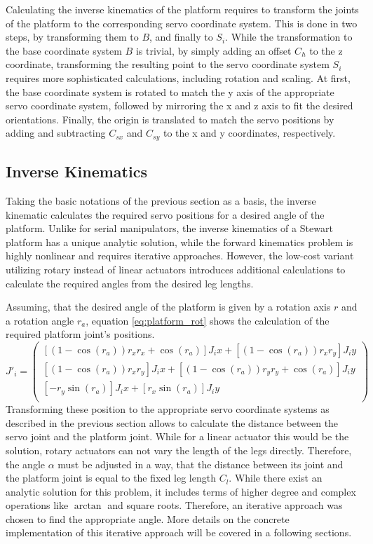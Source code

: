 Calculating the inverse kinematics of the platform requires to transform the
joints of the platform to the corresponding servo coordinate system. This is
done in two steps, by transforming them to $B$, and finally to $S_i$. While
the transformation to the base coordinate system $B$ is trivial, by simply
adding an offset $C_h$ to the z coordinate, transforming the resulting point
to the servo coordinate system $S_i$ requires more sophisticated calculations,
including rotation and scaling. At first, the base coordinate system is
rotated to match the y axis of the appropriate servo coordinate system,
followed by mirroring the x and z axis to fit the desired orientations.
Finally, the origin is translated to match the servo positions by adding and
subtracting $C_{sx}$ and $C_{sy}$ to the x and y coordinates, respectively.

\subsection{Inverse Kinematics}
Taking the basic notations of the previous section as a basis, the inverse
kinematic calculates the required servo positions for a desired angle of the
platform. Unlike for serial manipulators, the inverse kinematics of a Stewart
platform has a unique analytic solution, while the forward kinematics problem
is highly nonlinear and requires iterative approaches. However, the low-cost
variant utilizing rotary instead of linear actuators introduces additional
calculations to calculate the required angles from the desired leg lengths.

Assuming, that the desired angle of the platform is given by a rotation axis
$r$ and a rotation angle $r_a$, equation \ref{eq:platform_rot} shows the
calculation of the required platform joint's positions.
\begin{equation}
J'_i = 
\begin{pmatrix}
\left[\left(1 - \cos(r_a)\right) r_x r_x + \cos(r_a)\right] J_ix + \left[\left(1 - \cos(r_a)\right) r_x r_y\right] J_iy\\
\left[\left(1 - \cos(r_a)\right) r_x r_y\right] J_ix + \left[\left(1 - \cos(r_a)\right) r_y r_y + \cos(r_a)\right] J_iy\\
\left[-r_y \sin(r_a)\right] J_ix + \left[r_x \sin(r_a)\right] J_iy\\
\end{pmatrix}
\label{eq:platform_rot}
\end{equation}
Transforming these position to the appropriate servo coordinate systems as
described in the previous section allows to calculate the distance between the
servo joint and the platform joint. While for a linear actuator this would be
the solution, rotary actuators can not vary the length of the legs directly.
Therefore, the angle $\alpha$ must be adjusted in a way, that the distance
between its joint and the platform joint is equal to the fixed leg length
$C_l$. While there exist an analytic solution for this problem, it includes
terms of higher degree and complex operations like $\arctan$ and square roots.
Therefore, an iterative approach was chosen to find the appropriate angle.
More details on the concrete implementation of this iterative approach will be
covered in a following sections.

